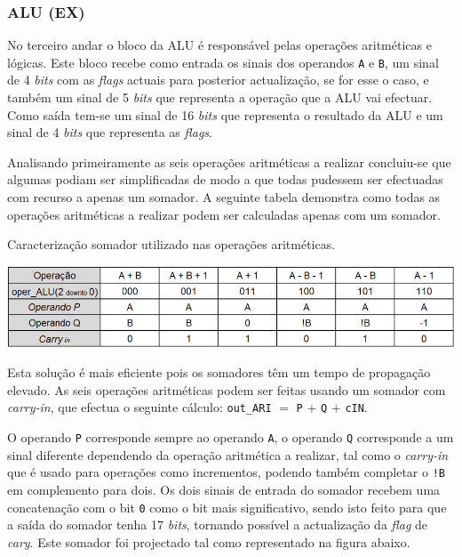 \documentclass[11pt]{article}
\numberwithin{equation}{section}
\begin{document}
\subsubsection{ALU (EX)}

No terceiro andar o bloco da ALU é responsável pelas operações aritméticas e lógicas. Este bloco recebe como entrada os sinais dos operandos \texttt{A} e \texttt{B}, um sinal de 4 \textit{bits} com as \textit{flags} actuais para posterior actualização, se for esse o caso, e também um sinal de 5 \textit{bits} que representa a operação que a ALU vai efectuar. Como saída tem-se um sinal de 16 \textit{bits} que representa o resultado da ALU e um sinal de 4 \textit{bits} que representa as \textit{flags}.

Analisando primeiramente as seis operações aritméticas a realizar concluiu-se que algumas podiam ser simplificadas de modo a que todas pudessem ser efectuadas com recurso a apenas um somador. A seguinte tabela demonstra como todas as operações aritméticas a realizar podem ser calculadas apenas com um somador.

\begin{table}[h]
	\centering
	\caption{Caracterização somador utilizado nas operações aritméticas.}
	\vspace{-2mm}
 	\includegraphics[keepaspectratio=true, scale=0.35]{tabelas/adder}
\end{table}

Esta solução é mais eficiente pois os somadores têm um tempo de propagação elevado. As seis operações aritméticas podem ser feitas usando um somador com \textit{carry-in}, que efectua o seguinte cálculo: \texttt{out\_ARI} $=$ \texttt{P} + \texttt{Q} + \texttt{cIN}. 

O operando \texttt{P} corresponde sempre ao operando \texttt{A}, o operando \texttt{Q} corresponde a  um sinal diferente dependendo da operação aritmética a realizar, tal como o \textit{carry-in} que é usado para operações como incrementos, podendo também completar o \texttt{!B} em complemento para dois. Os dois sinais de entrada do somador recebem uma concatenação com o bit \texttt{0} como o bit mais significativo, sendo isto feito para que a saída do somador tenha 17 \textit{bits}, tornando possível a actualização da \textit{flag} de \textit{cary}. Este somador foi projectado tal como representado na figura abaixo.
\end{document}
